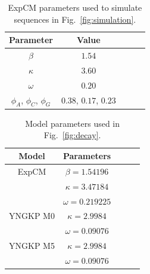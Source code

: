 \documentclass[11pt]{article}
\begin{document}
\begin{table}[t!]
\caption{\label{tab:simulation_params}
ExpCM parameters used to simulate sequences in Fig.~\ref{fig:simulation}.}
      \begin{tabular}{ccccc}
        \hline
          Parameter & Value\\ \hline
       	$\beta$ & $1.54$\\
	$\kappa$ & $3.60$\\
	$\omega$ & $0.20$\\
	$\phi_A$, $\phi_C$, $\phi_G$& $0.38$, $0.17$, $0.23$\\
      \end{tabular}
\end{table}

\begin{table}[t!]
\caption{\label{tab:wsn_low_params}
Model parameters used in  Fig.~\ref{fig:decay}.}
      \begin{tabular}{ccccc}
        \hline
          Model & Parameters\\ \hline
          ExpCM & $\beta=1.54196$\\
           & $\kappa=3.47184$\\
           & $\omega=0.219225$\\ 
          YNGKP M0 & $\kappa=2.9984$\\
          & $\omega=0.09076$\\
          YNGKP M5 & $\kappa=2.9984$\\
          & $\omega=0.09076$\\
      \end{tabular}
\end{table}
\end{document}
